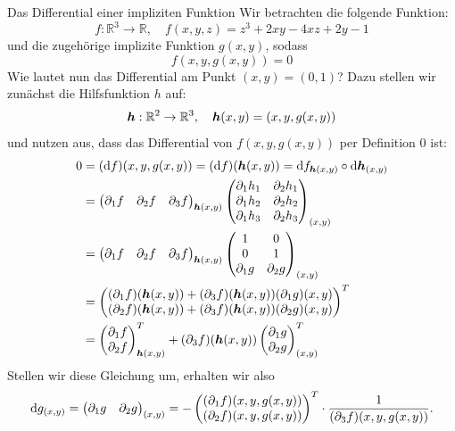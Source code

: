 \begin{Beispiel}
    {Das Differential einer impliziten Funktion}
    Wir betrachten die folgende Funktion:
    \begin{equation*}
        f:\mathbb{R}^3\rightarrow\mathbb{R}, \quad f(x,y,z)=z^3+2xy-4xz+2y-1
    \end{equation*}
    und die zugehörige implizite Funktion $g(x,y)$, sodass
    \begin{equation*}
        f(x,y,g(x,y))=0
    \end{equation*}
    Wie lautet nun das Differential am Punkt $(x,y)=(0,1)$? Dazu stellen wir zunächst die Hilfsfunktion $h$ auf:
    \begin{equation*}
        {{\text{\boldmath${h}$}}}:\mathbb{R}^2\rightarrow\mathbb{R}^3, \quad {{\text{\boldmath${h}$}}}(x,y)=(x,y,g(x,y))
    \end{equation*}
    und nutzen aus, dass das Differential von $f(x,y,g(x,y))$ per Definition $0$ ist:
    \begin{align*}
        0&=(\text{d}f)(x,y,g(x,y))=(\text{d}f)({{\text{\boldmath${h}$}}}(x,y))=\text{d}f_{{{\text{\boldmath${h}$}}}(x,y)}\circ\text{d}{{\text{\boldmath${h}$}}}_{(x,y)} \\ &= \begin{pmatrix}\partial_1 f & \partial_2 f & \partial_3 f\end{pmatrix}_{{{\text{\boldmath${h}$}}}(x,y)}\begin{pmatrix}\partial_1 h_1 & \partial_2 h_1 \\ \partial_1 h_2 & \partial_2 h_2 \\ \partial_1 h_3 & \partial_2 h_3\end{pmatrix}_{(x,y)} \\ &= \begin{pmatrix}\partial_1 f & \partial_2 f & \partial_3 f\end{pmatrix}_{{{\text{\boldmath${h}$}}}(x,y)}\begin{pmatrix}1 & 0 \\ 0 & 1 \\ \partial_1 g & \partial_2 g\end{pmatrix}_{(x,y)} \\ &= \begin{pmatrix}(\partial_1 f)({{\text{\boldmath${h}$}}}(x,y))+(\partial_3 f)({{\text{\boldmath${h}$}}}(x,y))(\partial_1 g)(x,y) \\ (\partial_2 f)({{\text{\boldmath${h}$}}}(x,y))+(\partial_3 f)({{\text{\boldmath${h}$}}}(x,y))(\partial_2 g)(x,y)\end{pmatrix}^T \\ &=\begin{pmatrix}\partial_1 f \\ \partial_2 f\end{pmatrix}^T_{{{\text{\boldmath${h}$}}}(x,y)} + (\partial_3 f)({{\text{\boldmath${h}$}}}(x,y))\begin{pmatrix}\partial_1 g \\ \partial_2 g\end{pmatrix}^T_{(x,y)}
    \end{align*}
    Stellen wir diese Gleichung um, erhalten wir also
    \begin{equation*}
        \text{d}g_{(x,y)} = \begin{pmatrix}\partial_1 g & \partial_2 g\end{pmatrix}_{(x,y)} = -\begin{pmatrix}(\partial_1 f)(x,y,g(x,y)) \\ (\partial_2 f)(x,y,g(x,y))\end{pmatrix}^T\cdot\frac{1}{(\partial_3 f)(x,y,g(x,y))}.
    \end{equation*}

\end{Beispiel}
